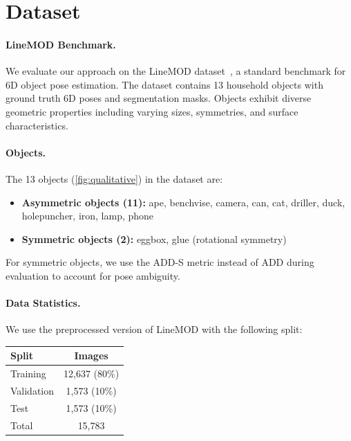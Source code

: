 \section{Dataset}
\label{sec:dataset}

\paragraph{LineMOD Benchmark.}
We evaluate our approach on the LineMOD dataset~\cite{hinterstoisser2012model}, a standard benchmark for 6D object pose estimation. The dataset contains 13 household objects with ground truth 6D poses and segmentation masks. Objects exhibit diverse geometric properties including varying sizes, symmetries, and surface characteristics.

\paragraph{Objects.}
The 13 objects (\cref{fig:qualitative}) in the dataset are:
\begin{itemize}
    \item \textbf{Asymmetric objects (11):} ape, benchvise, camera, can, cat, driller, duck, holepuncher, iron, lamp, phone
    \item \textbf{Symmetric objects (2):} eggbox, glue (rotational symmetry)
\end{itemize}
For symmetric objects, we use the ADD-S metric instead of ADD during evaluation to account for pose ambiguity.

\paragraph{Data Statistics.}
We use the preprocessed version of LineMOD with the following split:
\begin{center}
\begin{tabular}{l|c}
\textbf{Split} & \textbf{Images} \\
\hline
Training & 12,637 (80\%) \\
Validation & 1,573 (10\%) \\
Test & 1,573 (10\%) \\
\hline
Total & 15,783 \\
\end{tabular}
\end{center}

